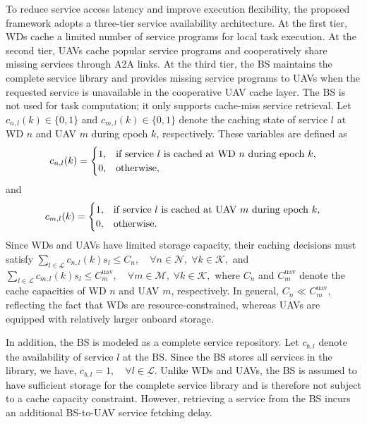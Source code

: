 \documentclass[journal]{IEEEtran}
\begin{document}
To reduce service access latency and improve execution flexibility, the proposed framework adopts a three-tier service availability architecture. At the first tier, WDs cache a limited number of service programs for local task execution. At the second tier, UAVs cache popular service programs and cooperatively share missing services through A2A links. At the third tier, the BS maintains the complete service library and provides missing service programs to UAVs when the requested service is unavailable in the cooperative 
UAV cache layer. The BS is not used for task computation; it only supports cache-miss service retrieval. Let $c_{n,l}(k)\in\{0,1\}$ and $c_{m,l}(k)\in\{0,1\}$ denote the caching state of service $l$ at WD $n$ and UAV $m$ during epoch $k$, respectively. These variables are defined as
\begin{equation}
\small
    c_{n,l}(k)=
    \begin{cases}
        1, & \text{if service } l \text{ is cached at WD } n 
        \text{ during epoch } k,\\
        0, & \text{otherwise},
    \end{cases}
    \label{eq:wd_cache_state}
\end{equation}
and
\begin{equation}
\small
    c_{m,l}(k)=
    \begin{cases}
        1, & \text{if service } l \text{ is cached at UAV } m 
        \text{ during epoch } k,\\
        0, & \text{otherwise}.
    \end{cases}
    \label{eq:uav_cache_state}
\end{equation}
Since WDs and UAVs have limited storage capacity, their caching decisions must satisfy $\sum_{l\in\mathcal{L}} c_{n,l}(k)s_l \leq C_n,
    \quad \forall n\in\mathcal{N},\;\forall k\in\mathcal{K},
    \label{eq:wd_cache_cap}$
and $\sum_{l\in\mathcal{L}} c_{m,l}(k)s_l \leq C_m^{\mathrm{uav}},
    \quad \forall m\in\mathcal{M},\;\forall k\in\mathcal{K},
    \label{eq:uav_cache_cap}$
where $C_n$ and $C_m^{\mathrm{uav}}$ denote the cache capacities of WD $n$ and UAV $m$, respectively. In general, $C_n\ll C_m^{\mathrm{uav}}$, reflecting the fact that WDs are resource-constrained, whereas UAVs 
are equipped with relatively larger onboard storage.

In addition, the BS is modeled as a complete service repository. Let $c_{b,l}$ denote the availability of service $l$ at the BS. Since the BS stores all services in the library, we have, $c_{b,l}=1,\quad \forall l\in\mathcal{L}.
    \label{eq:bs_cache_state}$
Unlike WDs and UAVs, the BS is assumed to have sufficient storage for the complete service library and is therefore not subject to a cache 
capacity constraint. However, retrieving a service from the BS incurs an additional BS-to-UAV service fetching delay.
\end{document}
